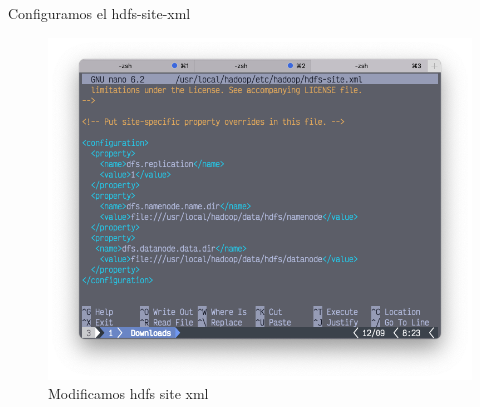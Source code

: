 Configuramos el hdfs-site-xml

\begin{figure}[h]
	\centering
	\includegraphics[scale=.35] {img/37-hdfs-site-xml}
	\caption{Modificamos hdfs site xml}
	\label{fig:37}	
\end{figure}
\clearpage

